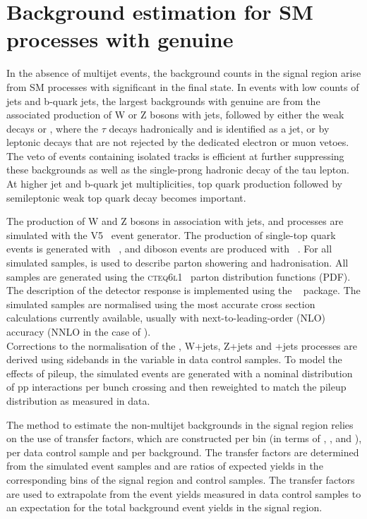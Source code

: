 \section{Background estimation for SM processes with genuine \ETmiss}
\label{sec:ewk_background}

In the absence of multijet events, the background counts in the signal
region arise from SM processes with significant \ETmiss in the final
state. In events with low counts of jets and b-quark jets, the largest
backgrounds with genuine \ETmiss are from the associated production of
W or Z bosons with jets, followed by either the weak decays \znunu or
\wtaunu, where the $\tau$ decays hadronically and is identified as a
jet, or by leptonic decays that are not rejected by the dedicated
electron or muon vetoes. The veto of events containing isolated tracks
is efficient at further suppressing these backgrounds as well as the
single-prong hadronic decay of the tau lepton. At higher jet and
b-quark jet multiplicities, top quark production followed by
semileptonic weak top quark decay becomes important.

The production of W and Z bosons in association with jets, \ttbar and
\gj processes are simulated with the \MADGRAPH V5~\cite{madgraph}
event generator. The production of single-top quark events is
generated with \POWHEG~\cite{powheg}, and diboson events are produced
with ~\cite{pythia8}. For all simulated samples, 
is used to describe parton showering and hadronisation. All samples
are generated using the \textsc{cteq6l1}~\cite{Pumplin:2002vw} parton
distribution functions (PDF). The description of the detector response
is implemented using the \GEANTfour~\cite{geant} package. The
simulated samples are normalised using the most accurate cross section
calculations currently available, usually with
next-to-leading-order (NLO) accuracy (NNLO in the case of \ttbar). \\
Corrections to the normalisation of the \gj, W+jets, Z+jets and \ttbar+jets 
processes are derived using sidebands in the \mht variable in data control samples. 
To model the effects of pileup, the simulated events are generated with a nominal distribution
of pp interactions per bunch crossing and then reweighted to match the
pileup distribution as measured in data.

The method to estimate the non-multijet backgrounds in the signal
region relies on the use of transfer factors, which are constructed
per bin (in terms of \njet, \nb, and \scalht), per data control
sample and per background. The transfer factors are determined from the simulated event
samples and are ratios of expected yields in the corresponding bins of
the signal region and control samples. The transfer factors are used
to extrapolate from the event yields measured in data control samples
to an expectation for the total background event yields in the signal
region.

